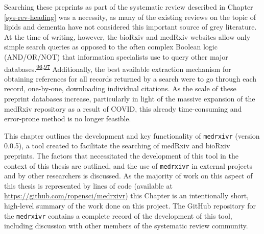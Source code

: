 \documentclass[a4paper, twoside]{templates/ociamthesis}
\begin{document}
Searching these preprints as part of the systematic review described in Chapter \ref{sys-rev-heading} was a necessity, as many of the existing reviews on the topic of lipids and dementia have not considered this important source of grey literature. At the time of writing, however, the bioRxiv and medRxiv websites allow only simple search queries as opposed to the often complex Boolean logic (AND/OR/NOT) that information specialists use to query other major databases.\textsuperscript{\protect\hyperlink{ref-bramer2018a}{96},\protect\hyperlink{ref-gusenbauer2020}{97}} Additionally, the best available extraction mechanism for obtaining references for all records returned by a search were to go through each record, one-by-one, downloading individual citations. As the scale of these preprint databases increase, particularly in light of the massive expansion of the medRxiv repository as a result of COVID, this already time-consuming and error-prone method is no longer feasible.

This chapter outlines the development and key functionality of \texttt{medrxivr} (version 0.0.5), a tool created to facilitate the searching of medRxiv and bioRxiv preprints. The factors that necessitated the development of this tool in the context of this thesis are outlined, and the use of \texttt{medrxivr} in external projects and by other researchers is discussed. As the majority of work on this aspect of this thesis is represented by lines of code (available at \url{https://github.com/ropensci/medrxivr}) this Chapter is an intentionally short, high-level summary of the work done on this project. The GitHub repository for the \texttt{medrxivr} contains a complete record of the development of this tool, including discussion with other members of the systematic review community.

~
\end{document}
